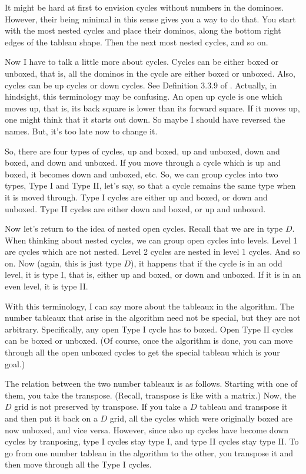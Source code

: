 \documentclass[12pt]{article}
\begin{document}
  It might be hard at first to envision cycles without numbers in the dominoes.
  However, their being minimal in this sense gives you a way to do that.
  You start with the most nested cycles and place their dominos, along the bottom right edges of the tableau shape.
  Then the next most nested cycles, and so on.

  Now I have to talk a little more about cycles.
  Cycles can be either boxed or unboxed, that is, all the dominos in the cycle are either boxed or unboxed.
  Also, cycles can be up cycles or down cycles.
  See Definition 3.3.9 of \cite{garfinkle_1993}.
  Actually, in hindsight, this terminology may be confusing.
  An open up cycle is one which moves up, that is, its back square is lower than its forward square.
  If it moves up, one might think that it starts out down.
  So maybe I should have reversed the names.
  But, it's too late now to change it.

  So, there are four types of cycles, up and boxed, up and unboxed, down and boxed, and down and unboxed.
  If you move through a cycle which is up and boxed, it becomes down and unboxed, etc.
  So, we can group cycles into two types, Type I and Type II, let's say, so that a cycle remains the same type when it is moved through.
  Type I cycles are either up and boxed, or down and unboxed.
  Type II cycles are either down and boxed, or up and unboxed.

  Now let's return to the idea of nested open cycles.
  Recall that we are in type $D$.
  When thinking about nested cycles, we can group open cycles into levels.
  Level 1 are cycles which are not nested.
  Level 2 cycles are nested in level 1 cycles.
  And so on.
  Now (again, this is just type $D$), it happens that if the cycle is in an odd level, it is type I, that is, either up and boxed, or down and unboxed.
  If it is in an even level, it is type II.

  With this terminology, I can say more about the tableaux in the algorithm.
  The number tableaux that arise in the algorithm need not be special, but they are not arbitrary.
  Specifically, any open Type I cycle has to boxed.
  Open Type II cycles can be boxed or unboxed.
  (Of course, once the algorithm is done, you can move through all the open unboxed cycles to get the special tableau which is your goal.)

  The relation between the two number tableaux is as follows.
  Starting with one of them, you take the transpose.
  (Recall, transpose is like with a matrix.)
  Now, the $D$ grid is not preserved by transpose.
  If you take a $D$ tableau and transpose it and then put it back on a $D$ grid, all the cycles which were originally boxed are now unboxed, and vice versa.
  However, since also up cycles have become down cycles by tranposing, type I cycles stay type I, and type II cycles stay type II.
  To go from one number tableau in the algorithm to the other, you transpose it and then move through all the Type I cycles.
\end{document}
